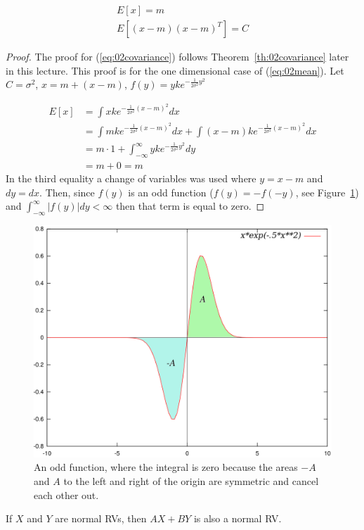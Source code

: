 \begin{theorem}
\label{th:02mean}
\begin{align}
\label{eq:02mean}
E[x] = m \\
\label{eq:02covariance}
E[(x-m){(x-m)}^T] = C
\end{align}
\end{theorem}
\begin{proof}
The proof for (\ref{eq:02covariance}) follows Theorem~\ref{th:02covariance} later in this lecture.
This proof is for the one dimensional case of (\ref{eq:02mean}).
Let $C=\sigma^2$, $x=m+(x-m)$, $f(y)=yke^{-\frac{1}{2\sigma^2}y^2}$

\begin{align*}
E[x] &= \int xke^{-\frac{1}{2\sigma^2}{(x-m)}^2}dx \\
&= \int mke^{-\frac{1}{2\sigma^2}{(x-m)}^2}dx + \int(x-m)ke^{-\frac{1}{2\sigma^2}{(x-m)}^2}dx \\
&= m \cdot 1 + \int_{-\infty}^\infty yke^{-\frac{1}{2\sigma^2}y^2}dy \\
&= m + 0 = m
\end{align*}
In the third equality a change of variables was used where $y=x-m$ and $dy=dx$.
Then, since $f(y)$ is an odd function ($f(y)=-f(-y)$, see Figure~\ref{fig:02oddFunction}) and $\int_{-\infty}^\infty|f(y)|dy < \infty$ then that term is equal to zero.
\end{proof}

\begin{figure}[ht!]
\centering
\includegraphics[width=.5\textwidth]{images/02oddFunction}
\caption{An odd function, where the integral is zero because the areas $-A$ and $A$ to the left and right of the origin are symmetric and cancel each other out.}
\label{fig:02oddFunction}
\end{figure}

\begin{theorem}
If $X$ and $Y$ are normal RVs, then $AX+BY$ is also a normal RV\@.
\end{theorem}

